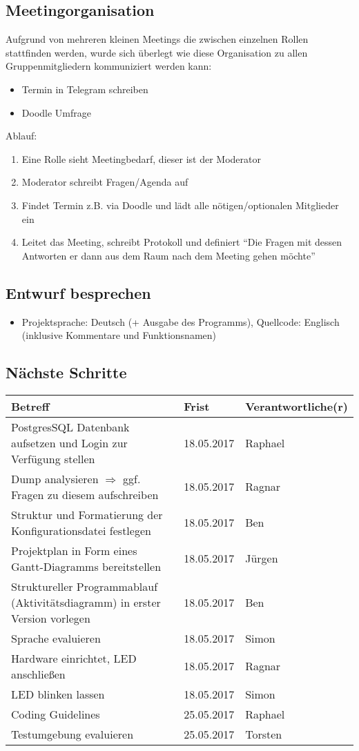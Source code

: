 \documentclass{scrartcl}
\begin{document}
\subsection{Meetingorganisation}
Aufgrund von mehreren kleinen Meetings die zwischen einzelnen Rollen stattfinden werden, wurde sich überlegt wie diese Organisation zu allen Gruppenmitgliedern kommuniziert werden kann:
\begin{itemize}
    \item Termin in Telegram schreiben
    \item Doodle Umfrage
\end{itemize}
Ablauf:
\begin{enumerate}
    \item Eine Rolle sieht Meetingbedarf, dieser ist der Moderator
    \item Moderator schreibt Fragen/Agenda auf
    \item Findet Termin z.B. via Doodle und lädt alle nötigen/optionalen Mitglieder ein
    \item Leitet das Meeting, schreibt Protokoll und definiert ``Die Fragen mit dessen Antworten er dann aus dem Raum nach dem Meeting gehen möchte''
\end{enumerate}

\subsection{Entwurf besprechen}
\begin{itemize}
    \item Projektsprache: Deutsch (+ Ausgabe des Programms), Quellcode: Englisch (inklusive Kommentare und Funktionsnamen)
\end{itemize}

\subsection{Nächste Schritte}
\begin{tabular}{L{.549} L{.2} L{.25}}
Betreff & Frist & Verantwortliche(r) \\\hline
PostgresSQL Datenbank aufsetzen und Login zur Verfügung stellen &18.05.2017 & Raphael\\\hline
Dump analysieren $\Rightarrow$ ggf. Fragen zu diesem aufschreiben &18.05.2017 & Ragnar\\\hline
Struktur und Formatierung der Konfigurationsdatei festlegen &18.05.2017 & Ben\\\hline
Projektplan in Form eines Gantt-Diagramms bereitstellen &18.05.2017 & Jürgen\\\hline
Struktureller Programmablauf (Aktivitätsdiagramm) in erster Version vorlegen&18.05.2017 & Ben\\\hline
Sprache evaluieren &18.05.2017 & Simon\\\hline
Hardware einrichtet, LED anschließen &18.05.2017 & Ragnar\\\hline
LED blinken lassen &18.05.2017 & Simon\\\hline    
Coding Guidelines &25.05.2017 & Raphael\\\hline
Testumgebung evaluieren &25.05.2017 & Torsten\\\hline
\end{tabular}
\end{document}
